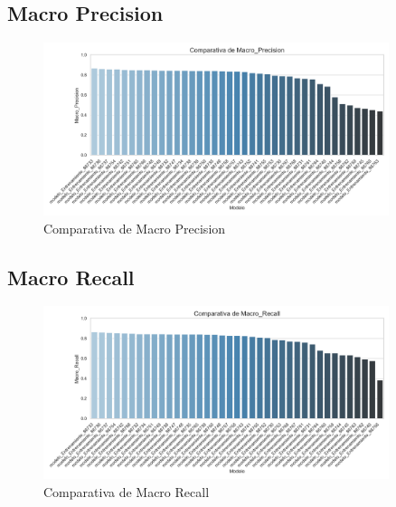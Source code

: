 \subsection{Macro Precision}
\begin{figure}[H]
\centering
\includegraphics[width=0.9\textwidth]{Graficas/Macro_Precision_barplot.png}
\caption{Comparativa de Macro Precision}
\end{figure}

\subsection{Macro Recall}
\begin{figure}[H]
\centering
\includegraphics[width=0.9\textwidth]{Graficas/Macro_Recall_barplot.png}
\caption{Comparativa de Macro Recall}
\end{figure}

